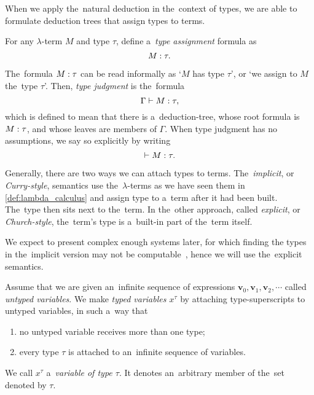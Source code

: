 
When we apply the~natural deduction in the~context of types, we are able to
formulate deduction trees that assign types to terms.

\begin{definition}
  For any $\lambda$-term $M$ and type $\tau$, define a~\emph{type assignment}
  formula as
  \[
    M \stackrel{}: \tau.
  \]
\end{definition}

The~formula $M \stackrel{}: \tau$ can be read informally as `$M$ has type $\tau$', or
`we assign to $M$ the~type $\tau$'. Then, \emph{type judgment} is the~formula
\[
  \Gamma \vdash M \stackrel{}: \tau,
\]
which is defined to mean that there is a~deduction-tree, whose root formula is
$M \stackrel{}: \tau$, and whose leaves are members of $\Gamma$. When type judgment
has no assumptions, we say so explicitly by writing
\[
  \vdash M \stackrel{}: \tau.
\]

\label{sec:stlc}

Generally, there are two ways we can attach types to terms. The~\emph{implicit},
or \emph{Curry-style}, semantics use the~$\lambda$-terms as we have seen them
in \autoref{def:lambda_calculus} and assign type to a~term after it had been
built. The~type then sits next to the~term. In the~other approach, called
\emph{explicit}, or \emph{Church-style}, the~term's type is a~built-in part of
the~term itself.

We expect to present complex enough systems later, for which finding the types
in the~implicit version may not be computable~\cite{wells_1999}, hence we will
use the~explicit semantics.

\begin{definition}
  Assume that we are given an~infinite sequence of expressions $\mathbf{v}_0,
  \mathbf{v}_1, \mathbf{v}_2, \cdots$ called \emph{untyped variables}. We make
  \emph{typed variables $x^\tau$} by attaching type-superscripts to untyped
  variables, in such a~way that
  \begin{enumerate}
    \item \label{def:typed_var:a_item} no untyped variable receives more than
      one type;
    \item \label{def:typed_var:b_item} every type $\tau$ is attached to
      an~infinite sequence of variables.
  \end{enumerate}
\end{definition}
We call $x^\tau$ a~\emph{variable of type $\tau$}. It denotes an~arbitrary
member of the~set denoted by $\tau$.

